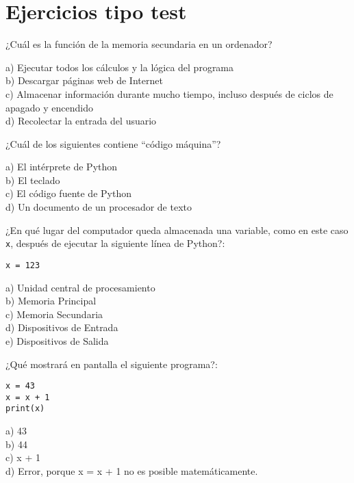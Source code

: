 \hypertarget{ejercicios}{%
\section*{Ejercicios tipo test}\label{ejercicios.test}}


\begin{ejercicio} 
\noindent ¿Cuál es la función de la memoria secundaria en un
ordenador?

a) Ejecutar todos los cálculos y la lógica del programa\\
b) Descargar páginas web de Internet\\
c) Almacenar información durante mucho tiempo, incluso después de ciclos
de apagado y encendido\\
d) Recolectar la entrada del usuario
\end{ejercicio}


\begin{ejercicio}
    ¿Cuál de los siguientes contiene ``código máquina''?

a) El intérprete de Python\\
b) El teclado\\
c) El código fuente de Python\\
d) Un documento de un procesador de texto

\end{ejercicio}


\begin{ejercicio} ¿En qué lugar del computador queda almacenada una
variable, como en este caso \verb|x|, después de ejecutar la siguiente
línea de Python?:


\begin{Verbatim}[frame=single]
x = 123
\end{Verbatim}

a) Unidad central de procesamiento\\
b) Memoria Principal\\
c) Memoria Secundaria\\
d) Dispositivos de Entrada\\
e) Dispositivos de Salida
\end{ejercicio}


\begin{ejercicio} ¿Qué mostrará en pantalla el siguiente programa?:

\begin{Verbatim}[frame=single]
x = 43
x = x + 1
print(x)
\end{Verbatim}

a) 43\\
b) 44\\
c) x + 1\\
d) Error, porque x = x + 1 no es posible matemáticamente.
\end{ejercicio}

